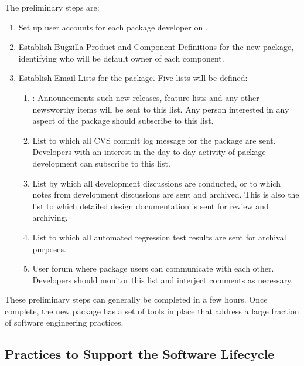 \documentclass[12pt,relax]{TrilinosDevGuide}
\begin{document}
The preliminary steps are:
\begin{enumerate}
\item Set up user accounts for each package developer 
on .
\item Establish Bugzilla Product and Component Definitions for the new
package, identifying who will be default owner of each component.
\item Establish Email Lists for the package.  Five lists will be
defined:
\begin{enumerate}
\item {}: 
Announcements such
new releases, feature lists and any other newsworthy items will be
sent to this list.  Any person interested in any aspect of the package
should subscribe to this list.
\item {} List
to which all CVS commit log message for the package are sent.
Developers with an interest in the day-to-day activity of package
development can subscribe to this list.
\item {}
List by which all development discussions are conducted, or to which
notes from development discussions are sent and archived.  This is
also the list to which detailed design documentation is sent for
review and archiving.
\item {} List
to which all automated regression test results are sent for archival purposes.
\item {} User
forum where package users can communicate with each other.  Developers
should monitor this list and interject comments as necessary.
\end{enumerate}
\end{enumerate}
These preliminary steps can generally be completed in a few hours.
Once complete, the new package has a set of tools in place that
address a large fraction of software engineering practices.

\subsection{Practices to Support the Software Lifecycle}
\end{document}
